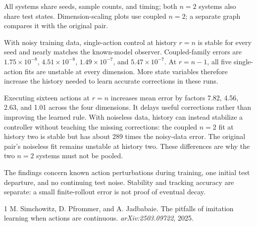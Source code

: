 \documentclass{l4dc2026}
\begin{document}
All systems share seeds, sample counts, and timing; both $n=2$ systems also share test states. Dimension-scaling plots use coupled $n=2$; a separate graph compares it with the original pair.

With noisy training data, single-action control at history $r=n$ is stable for every seed and nearly matches the known-model observer. Coupled-family errors are $1.75\times10^{-8}$, $4.51\times10^{-8}$, $1.49\times10^{-7}$, and $5.47\times10^{-7}$. At $r=n-1$, all five single-action fits are unstable at every dimension. More state variables therefore increase the history needed to learn accurate corrections in these runs.

Executing sixteen actions at $r=n$ increases mean error by factors 7.82, 4.56, 2.63, and 1.01 across the four dimensions. It delays useful corrections rather than improving the learned rule. With noiseless data, history can instead stabilize a controller without teaching the missing corrections: the coupled $n=2$ fit at history two is stable but has about 289 times the noisy-data error. The original pair's noiseless fit remains unstable at history two. These differences are why the two $n=2$ systems must not be pooled.

The findings concern known action perturbations during training, one initial test departure, and no continuing test noise. Stability and tracking accuracy are separate: a small finite-rollout error is not proof of eventual decay.

\footnotesize
\begin{thebibliography}{1}
M. Simchowitz, D. Pfrommer, and A. Jadbabaie.
The pitfalls of imitation learning when actions are continuous.
\emph{arXiv:2503.09722}, 2025.
\end{thebibliography}
\end{document}
